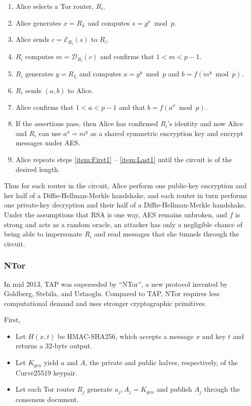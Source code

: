 \begin{enumerate}
	\item \label{item:First1}
		Alice selects a Tor router, $ R_{i} $.
	\item
		Alice generates $ x = R_{L} $ and computes $ s = g ^ x \bmod{p} $.
	\item
		Alice sends $ c = \mathcal{E}_{R_{i}}(s) $ to $ R_{i} $.
	\item
		$ R_{i} $ computes $ m = \mathcal{D}_{R_{i}}(c) $ and confirms that $ 1 < m < p - 1 $.
	\item
		$ R_{i} $ generates $ y = R_{L} $ and computes $ a = g ^ y \bmod{p} $ and $ b = f(m ^ y \bmod{p}) $.
	\item
		$ R_{i} $ sends $ (a, b) $ to Alice.
	\item
		Alice confirms that $ 1 < a < p - 1 $ and that $ b = f(a ^ x \bmod{p}) $.
	\item \label{item:Last1}
		If the assertions pass, then Alice has confirmed $ R_{i} $'s identity and now Alice and $ R_{i} $ can use $ a ^ x = m ^ y $ as a shared symmetric encryption key and encrypt messages under AES.
	\item 
		Alice repeats steps \ref{item:First1} -- \ref{item:Last1} until the circuit is of the desired length.
\end{enumerate}

Thus for each router in the circuit, Alice perform one public-key encryption and her half of a Diffie-Hellman-Merkle handshake, and each router in turn performs one private-key decryption and their half of a Diffie-Hellman-Merkle handshake. Under the assumptions that RSA is one way, AES remains unbroken, and $ f $ is strong and acts as a random oracle, an attacker has only a negligible chance of being able to impersonate $ R_{i} $ and read messages that she tunnels through the circuit.\cite{goldberg2006security}

\subsubsection{NTor}

In mid 2013, TAP was superseded by ``NTor'', a new protocol invented by Goldberg, Stebila, and Ustaoglu.\cite{goldberg2013anonymity} Compared to TAP, NTor requires less computational demand and uses stronger cryptographic primitives.

First,

\begin{itemize}
	\item Let $ H(x,t) $ be HMAC-SHA256, which accepts a message $ x $ and key $ t $ and returns a 32-byte output.
	\item Let $ K_{\mathit{gen}} $ yield $ a $ and $ A $, the private and public halves, respectively, of the Curve25519\cite{bernstein2006curve25519} keypair.
	\item Let each Tor router $ R_{j} $ generate $ a_{j},A_{j} = K_{\mathit{gen}} $ and publish $ A_{j} $ through the consensus document.
\end{itemize}

